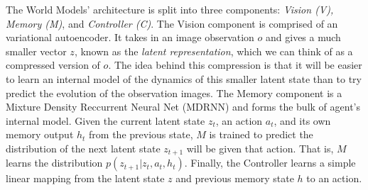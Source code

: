 \documentclass{article}
\theoremstyle{definition}
\begin{document}
The World Models' architecture is split into three components: \textit{Vision (V), Memory (M)}, and \textit{Controller (C)}.
The Vision component is comprised of an variational autoencoder.
It takes in an image observation $o$ and gives a much smaller vector $z$, known as the \textit{latent representation}, which we can think of as a compressed version of $o$.
The idea behind this compression is that it will be easier to learn an internal model of the dynamics of this smaller latent state than to try predict the evolution of the observation images. 
The Memory component is a Mixture Density Reccurrent Neural Net (MDRNN) and forms the bulk of agent's internal model.
Given the current latent state $z_t$, an action $a_t$, and its own memory output $h_{t}$ from the previous state, $M$ is trained to predict the distribution of the next latent state $z_{t+1}$ will be given that action.
That is, $M$ learns the distribution $p(z_{t+1} | z_t, a_t, h_t)$.
Finally, the Controller learns a simple linear mapping from the latent state $z$ and previous memory state $h$ to an action. 
\end{document}
